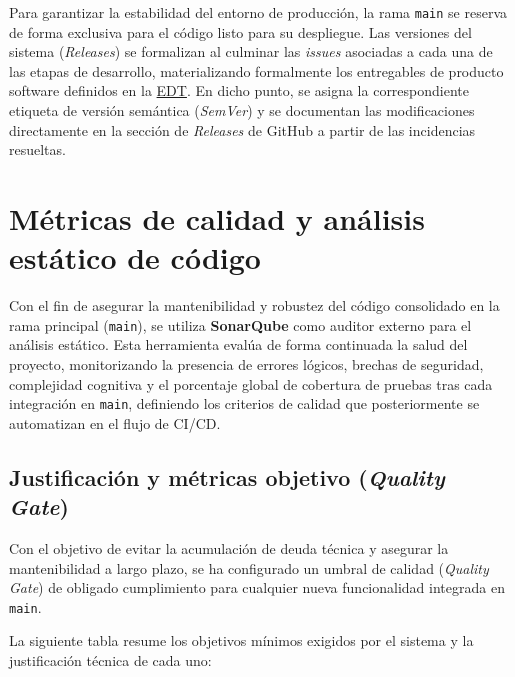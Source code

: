Para garantizar la estabilidad del entorno de producción, la rama \texttt{main} se reserva de forma exclusiva para el código listo para su despliegue. Las versiones del sistema (\textit{Releases}) se formalizan al culminar las \textit{issues} asociadas a cada una de las etapas de desarrollo, materializando formalmente los entregables de producto software definidos en la \hyperref[fig:edt_grafica]{EDT}. En dicho punto, se asigna la correspondiente etiqueta de versión semántica (\textit{SemVer}) y se documentan las modificaciones directamente en la sección de \textit{Releases} de GitHub a partir de las incidencias resueltas. 

\section{Métricas de calidad y análisis estático de código}\label{sec:metricas_calidad}

Con el fin de asegurar la mantenibilidad y robustez del código consolidado en la rama principal (\texttt{main}), se utiliza \textbf{SonarQube} como auditor externo para el análisis estático. Esta herramienta evalúa de forma continuada la salud del proyecto, monitorizando la presencia de errores lógicos, brechas de seguridad, complejidad cognitiva y el porcentaje global de cobertura de pruebas tras cada integración en \texttt{main}, definiendo los criterios de calidad que posteriormente se automatizan en el flujo de CI/CD.

\subsection{Justificación y métricas objetivo (\textit{Quality Gate})}\label{subsec:sonar_quality_gate}

Con el objetivo de evitar la acumulación de deuda técnica y asegurar la mantenibilidad a largo plazo, se ha configurado un umbral de calidad (\textit{Quality Gate}) de obligado cumplimiento para cualquier nueva funcionalidad integrada en \texttt{main}.

La siguiente tabla resume los objetivos mínimos exigidos por el sistema y la justificación técnica de cada uno:

